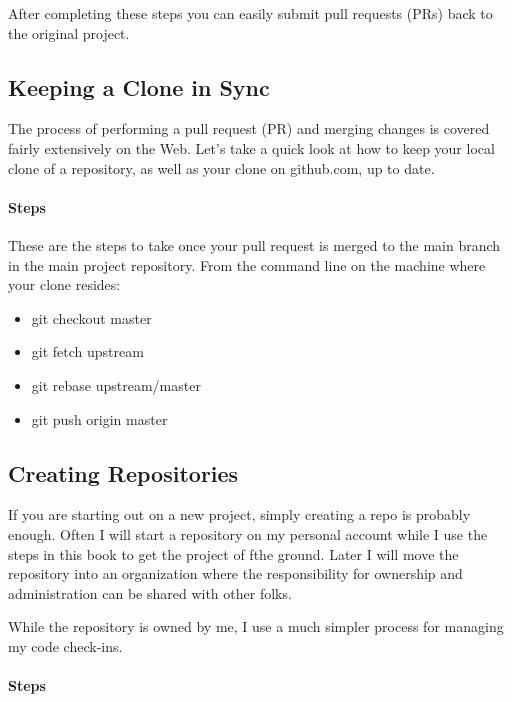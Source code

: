 After completing these steps you can easily submit pull requests (PRs)
back to the original project.

\hypertarget{keeping-a-clone-in-sync}{%
\subsection{Keeping a Clone in Sync}\label{keeping-a-clone-in-sync}}

The process of performing a pull request (PR) and merging changes is
covered fairly extensively on the Web. Let's take a quick look at how to
keep your local clone of a repository, as well as your clone on
github.com, up to date.

\hypertarget{steps-1}{%
\paragraph{Steps}\label{steps-1}}

These are the steps to take once your pull request is merged to the main
branch in the main project repository. From the command line on the
machine where your clone resides:

\begin{itemize}
\item
  git checkout master
\item
  git fetch upstream
\item
  git rebase upstream/master
\item
  git push origin master
\end{itemize}


\subsection{Creating Repositories}

\justify
If you are starting out on a new project, simply creating a repo is
probably enough. Often I will start a repository on my personal account
while I use the steps in this book to get the project of fthe ground.
Later I will move the repository into an organization where the
responsibility for ownership and administration can be shared with other
folks.

\justify
While the repository is owned by me, I use a much simpler process for
managing my code check-ins.

\hypertarget{steps-2}{%
\paragraph{Steps}\label{steps-2}}

